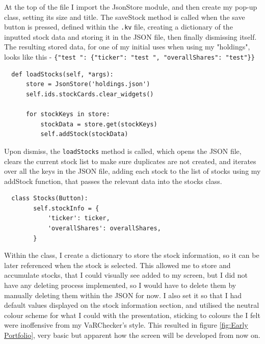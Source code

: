 \documentclass{article}
\begin{document}
\vspace{0.3cm}
At the top of the file I import the JsonStore module, and then create my pop-up class, setting its size and title. The saveStock method is called when the save button is pressed, defined within the \texttt{.kv} file, creating a dictionary of the inputted stock data and storing it in the JSON file, then finally dismissing itself. The resulting stored data, for one of my initial uses when using my "holdings", looks like this - \texttt{\{"test ": \{"ticker": "test ", "overallShares": "test"\}\}}\\\vspace{0.3cm}

\begin{verbatim}
  def loadStocks(self, *args):
      store = JsonStore('holdings.json')
      self.ids.stockCards.clear_widgets()

      for stockKeys in store:
          stockData = store.get(stockKeys)
          self.addStock(stockData)
\end{verbatim}

\vspace{0.3cm}
Upon dismiss, the \texttt{loadStocks} method is called, which opens the JSON file, clears the current stock list to make sure duplicates are not created, and iterates over all the keys in the JSON file, adding each stock to the list of stocks using my addStock function, that passes the relevant data into the stocks class.\\\vspace{0.3cm}

\begin{verbatim}
  class Stocks(Button):
        self.stockInfo = {
            'ticker': ticker,
            'overallShares': overallShares,
        }
\end{verbatim}

\vspace{0.3cm}
Within the class, I create a dictionary to store the stock information, so it can be later referenced when the stock is selected. This allowed me to store and accumulate stocks, that I could visually see added to my screen, but I did not have any deleting process implemented, so I would have to delete them by manually deleting them within the JSON for now. I also set it so that I had default values displayed on the stock information section, and utilised the neutral colour scheme for what I could with the presentation, sticking to colours the I felt were inoffensive from my VaRChecker's style. This resulted in figure \ref{fig:Early Portfolio}, very basic but apparent how the screen will be developed from now on. \\\vspace{0.3cm}
\end{document}
